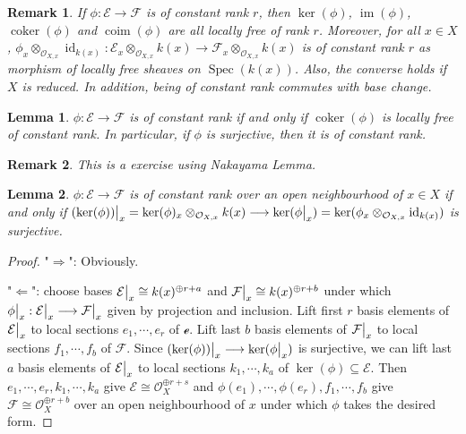 \documentclass{ctexart}
\newtheorem{remark}{Remark}[section]
\newtheorem{lemma}{Lemma}[section]
\newcommand{\im}{\operatorname{im}}
\newcommand{\identity}{\operatorname{id}}
\newcommand{\coker}{\operatorname{coker}}
\newcommand{\coim}{\operatorname{coim}}
\newcommand{\spec}{\operatorname{Spec}}
\begin{document}
\begin{remark}
    If $\phi: \mathcal{E} \longrightarrow \mathcal{F}$ is of constant rank $r$, 
    then $\ker(\phi)$, $\im(\phi)$, $\coker(\phi)$ and $\coim(\phi)$ are all locally free of rank $r$.
    Moreover, for all $x\in X$, $\phi_{x} \otimes_{\mathcal{O}_{X, x}} \identity_{k(x)}: \mathcal{E}_{x} \otimes_{\mathcal{O}_{X, x}} k(x) \longrightarrow \mathcal{F}_{x} \otimes_{\mathcal{O}_{X, x}} k(x)$ is of constant rank $r$ as morphism of locally free sheaves on $\spec(k(x))$.
    Also, the converse holds if $X$ is reduced.
    In addition, being of constant rank commutes with base change.
\end{remark}
\begin{lemma}
    $\phi: \mathcal{E} \longrightarrow \mathcal{F}$ is of constant rank if and only if $\coker(\phi)$ is locally free of constant rank.
    In particular, if $\phi$ is surjective, then it is of constant rank.
    \label{Lemma 12.2}
\end{lemma}
\begin{remark}
    This is a exercise using Nakayama Lemma.
\end{remark}
\begin{lemma}
    $\phi: \mathcal{E} \longrightarrow \mathcal{F}$ is of constant rank over an open neighbourhood of $x\in X$ if and only if $(\ker(\phi))\big{|}_{x} = \ker(\phi)_{x} \otimes_{\mathcal{O}_{X, x}} k(x) \longrightarrow \ker(\phi\big{|}_{x}) = \ker(\phi_{x} \otimes_{\mathcal{O}_{X, x}} \identity_{k(x)})$ is surjective.
    \label{Lemma 12.3} 
\end{lemma}
\begin{proof}
    "$\Rightarrow$": Obviously. 
    \par
    "$\Leftarrow$": choose bases $\mathcal{E}\big{|}_{x} \cong k(x)^{\oplus r + a}$ and $\mathcal{F}\big{|}_{x} \cong k(x)^{\oplus r + b}$ under which $\phi\big{|}_{x}: \mathcal{E}\big{|}_{x} \longrightarrow \mathcal{F}\big{|}_{x}$ given by projection and inclusion.
    Lift first $r$ basis elements of $\mathcal{E}\big{|}_{x}$ to local sections $e_{1}, \cdots, e_{r}$ of $\mathcal{e}$.
    Lift last $b$ basis elements of $\mathcal{F}\big{|}_{x}$ to local sections $f_{1}, \cdots, f_{b}$ of $\mathcal{F}$.
    Since $(\ker(\phi))\big{|}_{x} \longrightarrow \ker(\phi\big{|}_{x})$ is surjective, we can lift last $a$ basis elements of $\mathcal{E}\big{|}_{x}$ to local sections $k_{1}, \cdots, k_{a}$ of $\ker(\phi) \subseteq \mathcal{E}$.
    Then $e_{1}, \cdots, e_{r}, k_{1}, \cdots, k_{a}$ give $\mathcal{E} \cong \mathcal{O}_{X}^{\oplus r + s}$ and $\phi(e_{1}), \cdots, \phi(e_{r}), f_{1}, \cdots, f_{b}$ give $\mathcal{F} \cong \mathcal{O}_{X}^{\oplus r + b}$ over an open neighbourhood of $x$ under which $\phi$ takes the desired form.
\end{proof}
\end{document}

